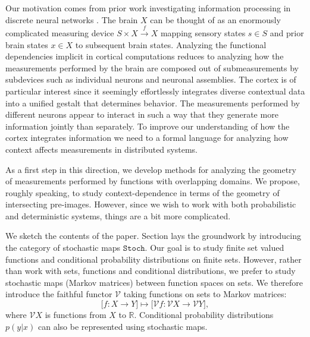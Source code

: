 \documentclass[12pt]{article}
\newcommand{\vecify}{{\mathcal V}}
\newcommand{\scat}{{\mathtt{Stoch}}}
\newcommand{\bR}{{\mathbb R}}
\theoremstyle{remark}
\begin{document}
Our motivation comes from prior work investigating information processing 
in discrete neural networks \cite{bt:08, bt:09}. The brain $X$ can be 
thought of as an enormously complicated measuring device $S\times 
X\xrightarrow{f} X$ mapping sensory states $s\in S$ and prior brain states 
$x\in X$ to subsequent brain states. Analyzing the functional dependencies 
implicit in cortical computations reduces to analyzing how the measurements 
performed by the brain are composed out of submeasurements by subdevices 
such as individual neurons and neuronal assemblies. The cortex is of 
particular interest since it seemingly effortlessly integrates diverse 
contextual data into a unified gestalt that determines behavior. The 
measurements performed by different neurons appear to interact in such 
a way that they generate more information jointly than separately. To 
improve our understanding of how the cortex integrates information we need 
to a formal language for analyzing how context affects measurements in 
distributed systems. 

As a first step in this direction, we develop methods for analyzing the 
geometry of measurements performed by functions with overlapping domains. 
We propose, roughly speaking, to study context-dependence in terms of the 
geometry of intersecting pre-images. However, since we wish to work with 
both probabilistic and deterministic systems, things are a bit more 
complicated. 

We sketch the contents of the paper. Section %
lays the groundwork by introducing the category of stochastic maps $\scat$. 
Our goal is to study finite set valued functions and conditional probability
distributions on finite sets. However, rather than work with sets, functions
and conditional distributions, we prefer to study stochastic maps (Markov 
matrices) between function spaces on sets. We therefore introduce the 
faithful functor $\vecify$ taking functions on sets to Markov matrices:
\begin{equation*}
	\Big[f:X\rightarrow Y\Big]\mapsto\Big[\vecify f:\vecify X\rightarrow 
    \vecify Y\Big],
\end{equation*}
where $\vecify X$ is functions from $X$ to $\bR$. Conditional probability 
distributions $p(y|x)$ can also be represented using stochastic maps. 
\end{document}
